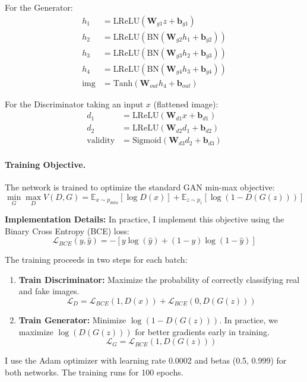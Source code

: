 \documentclass[11pt,a4paper]{article}
\begin{document}
For the Generator:
\begin{align*}
h_1 &= \text{LReLU}(\mathbf{W}_{g1}z + \mathbf{b}_{g1}) \\
h_2 &= \text{LReLU}(\text{BN}(\mathbf{W}_{g2}h_1 + \mathbf{b}_{g2})) \\
h_3 &= \text{LReLU}(\text{BN}(\mathbf{W}_{g3}h_2 + \mathbf{b}_{g3})) \\
h_4 &= \text{LReLU}(\text{BN}(\mathbf{W}_{g4}h_3 + \mathbf{b}_{g4})) \\
\text{img} &= \text{Tanh}(\mathbf{W}_{out}h_4 + \mathbf{b}_{out})
\end{align*}

For the Discriminator taking an input $x$ (flattened image):
\begin{align*}
d_1 &= \text{LReLU}(\mathbf{W}_{d1}x + \mathbf{b}_{d1}) \\
d_2 &= \text{LReLU}(\mathbf{W}_{d2}d_1 + \mathbf{b}_{d2}) \\
\text{validity} &= \text{Sigmoid}(\mathbf{W}_{d3}d_2 + \mathbf{b}_{d3})
\end{align*}

\paragraph{Training Objective.} The network is trained to optimize the standard GAN min-max objective:
\[ \min_G \max_D V(D, G) = \mathbb{E}_{x \sim p_{data}}[\log D(x)] + \mathbb{E}_{z \sim p_{z}}[\log (1 - D(G(z)))] \]

\textbf{Implementation Details:}
In practice, I implement this objective using the Binary Cross Entropy (BCE) loss:
\[ \mathcal{L}_{BCE}(y, \hat{y}) = - [y \log(\hat{y}) + (1-y) \log(1-\hat{y})] \]

The training proceeds in two steps for each batch:
\begin{enumerate}
    \item \textbf{Train Discriminator:} Maximize the probability of correctly classifying real and fake images.
    \[ \mathcal{L}_D = \mathcal{L}_{BCE}(1, D(x)) + \mathcal{L}_{BCE}(0, D(G(z))) \]
    \item \textbf{Train Generator:} Minimize $\log(1 - D(G(z)))$. In practice, we maximize $\log(D(G(z)))$ for better gradients early in training.
    \[ \mathcal{L}_G = \mathcal{L}_{BCE}(1, D(G(z))) \]
\end{enumerate}

I use the Adam optimizer with learning rate 0.0002 and betas (0.5, 0.999) for both networks. The training runs for 100 epochs.
\end{document}
